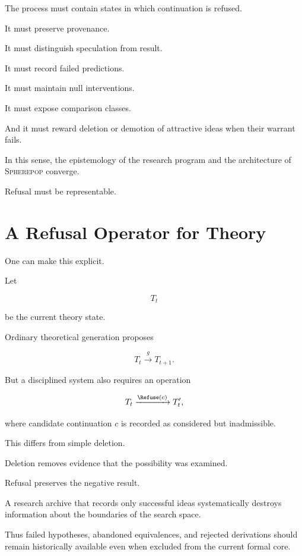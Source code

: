 \documentclass[11pt]{article}
\theoremstyle{remark}
\newcommand{\Spherepop}{\textsc{Spherepop}}
\begin{document}
The process must contain states in which continuation is refused.

It must preserve provenance.

It must distinguish speculation from result.

It must record failed predictions.

It must maintain null interventions.

It must expose comparison classes.

And it must reward deletion or demotion of attractive ideas when their warrant
fails.

In this sense, the epistemology of the research program and the architecture of
\Spherepop{} converge.

Refusal must be representable.

\section{A Refusal Operator for Theory}

One can make this explicit.

Let

\begin{equation}
T_t
\end{equation}

be the current theory state.

Ordinary theoretical generation proposes

\begin{equation}
T_t\xrightarrow{g}T_{t+1}.
\end{equation}

But a disciplined system also requires an operation

\begin{equation}
T_t\xrightarrow{\Refuse(c)}T_t',
\end{equation}

where candidate continuation $c$ is recorded as considered but inadmissible.

This differs from simple deletion.

Deletion removes evidence that the possibility was examined.

Refusal preserves the negative result.

A research archive that records only successful ideas systematically destroys
information about the boundaries of the search space.

Thus failed hypotheses, abandoned equivalences, and rejected derivations should
remain historically available even when excluded from the current formal core.
\end{document}
